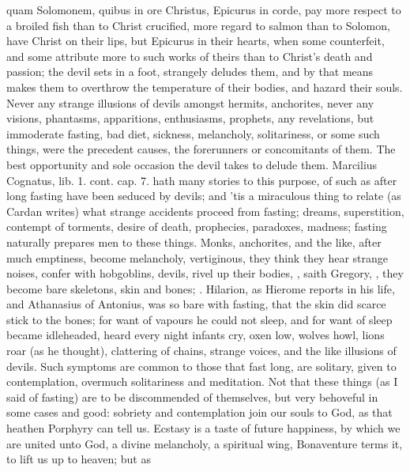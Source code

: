 {{quam Solomonem, quibus in ore Christus, Epicurus in corde}, pay more
respect to a broiled fish than to Christ crucified, more regard to
salmon than to Solomon, have Christ on their lips, but Epicurus in
their hearts, when some counterfeit, and some attribute more to such
works of theirs than to Christ's death and passion; the devil sets in a
foot, strangely deludes them, and by that means makes them to overthrow
the temperature of their bodies, and hazard their souls. Never any
strange illusions of devils amongst hermits, anchorites, never any
visions, phantasms, apparitions, enthusiasms, prophets, any
revelations, but immoderate fasting, bad diet, sickness, melancholy,
solitariness, or some such things, were the precedent causes, the
forerunners or concomitants of them. The best opportunity and sole
occasion the devil takes to delude them. Marcilius Cognatus, lib. 1.
cont. cap. 7. hath many stories to this purpose, of such as after long
fasting have been seduced by devils; and 'tis a miraculous thing
to relate (as Cardan writes) what strange accidents proceed from
fasting; dreams, superstition, contempt of torments, desire of death,
prophecies, paradoxes, madness; fasting naturally prepares men to these
things. Monks, anchorites, and the like, after much emptiness, become
melancholy, vertiginous, they think they hear strange noises, confer
with hobgoblins, devils, rivel up their bodies, , saith Gregory, , they
become bare skeletons, skin and bones; . Hilarion,
as Hierome reports in his life, and Athanasius of Antonius, was
so bare with fasting, that the skin did scarce stick to the bones; for
want of vapours he could not sleep, and for want of sleep became
idleheaded, heard every night infants cry, oxen low, wolves howl, lions
roar (as he thought), clattering of chains, strange voices, and the
like illusions of devils. Such symptoms are common to those that fast
long, are solitary, given to contemplation, overmuch solitariness and
meditation. Not that these things (as I said of fasting) are to be
discommended of themselves, but very behoveful in some cases and good:
sobriety and contemplation join our souls to God, as that heathen
Porphyry can tell us. Ecstasy is a taste of future
happiness, by which we are united unto God, a divine melancholy, a
spiritual wing, Bonaventure terms it, to lift us up to heaven; but as
}
